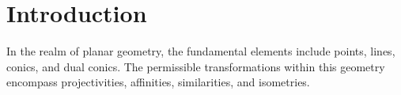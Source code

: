 \section{Introduction}

In the realm of planar geometry, the fundamental elements include points, lines, conics, and dual conics. 
The permissible transformations within this geometry encompass projectivities, affinities, similarities, and isometries.